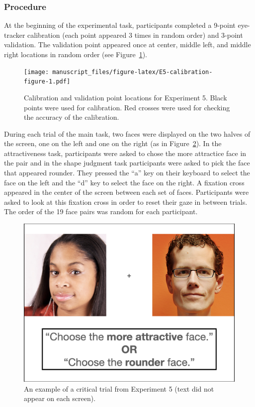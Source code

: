 \documentclass[
  man,floatsintext]{apa6}
\begin{document}
\subsubsection{Procedure}\label{procedure-5}

At the beginning of the experimental task, participants completed a
9-point eye-tracker calibration (each point appeared 3 times in random
order) and 3-point validation. The validation point appeared once at
center, middle left, and middle right locations in random order (see Figure~\ref{fig:E5-calibration-figure}).

\begin{figure}
\centering
\texttt{[image: manuscript\_files/figure-latex/E5-calibration-figure-1.pdf]}
\caption{\label{fig:E5-calibration-figure}Calibration and validation point locations for Experiment 5. Black points were used for calibration. Red crosses were used for checking the accuracy of the calibration.}
\end{figure}

During each trial of the main task, two faces were displayed on the two
halves of the screen, one on the left and one on the right (as in Figure~\ref{fig:E5-example-trial}). In the attractiveness task,
participants were asked to chose the more attractice face in the pair
and in the shape judgment task participants were asked to pick the face
that appeared rounder. They pressed the ``a'' key on their keyboard to
select the face on the left and the ``d'' key to select the face on the
right. A fixation cross appeared in the center of the screen between
each set of faces. Participants were asked to look at this fixation
cross in order to reset their gaze in between trials. The order of
the 19 face pairs was random for each participant.

\begin{figure}
\centering
\includegraphics{group-e/E5-example-figure.jpeg}
\caption{\label{fig:E5-example-trial}An example of a critical trial from Experiment 5 (text did not appear on each screen).}
\end{figure}
\end{document}
